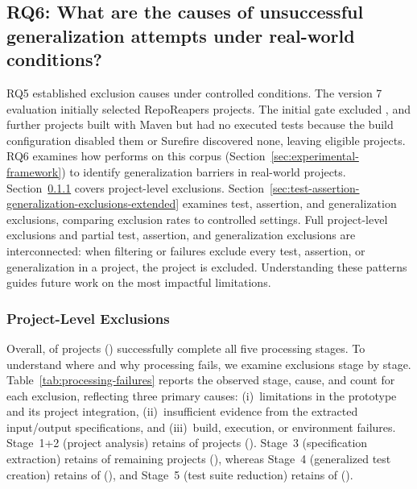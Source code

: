 \subsection{RQ6: What are the causes of unsuccessful generalization attempts under real-world conditions?}
\label{sec:limitations-eval-extended}

RQ5 established exclusion causes under controlled conditions.
The version 7 evaluation initially selected \TzRealworldSelectedProjects{} RepoReapers projects.
The initial gate excluded \TzRealworldInitialGateExcludedProjects{},
and \TzRealworldNoExecutedTestExcludedProjects{} further projects built with Maven
but had no executed tests because the build configuration disabled them or Surefire discovered none,
leaving \TzRealworldEligibleProjects{} eligible projects.
RQ6 examines how \ToolTeralizer{} performs on this corpus
(Section~\ref{sec:experimental-framework})
to identify generalization barriers in real-world projects.
Section~\ref{sec:project-level-exclusions-extended} covers project-level exclusions.
Section~\ref{sec:test-assertion-generalization-exclusions-extended} examines
test, assertion, and generalization exclusions,
comparing exclusion rates to controlled settings.
Full project-level exclusions and
partial test, assertion, and generalization exclusions are interconnected:
when filtering or failures exclude every test, assertion, or generalization in a project,
the project is excluded.
Understanding these patterns guides future work on the most impactful limitations.

\subsubsection{Project-Level Exclusions}%
\label{sec:project-level-exclusions-extended}

Overall, \TzRealworldApplicabilityProjects{} of \TzRealworldEligibleProjects{} projects
(\TzRealworldApplicabilityPct{}) successfully complete all five processing stages.
To understand where and why processing fails,
we examine exclusions stage by stage.
Table~\ref{tab:processing-failures} reports the observed stage, cause, and count for each exclusion,
reflecting three primary causes:
(i)~limitations in the prototype and its project integration,
(ii)~insufficient evidence from the extracted input/output specifications,
and (iii)~build, execution, or environment failures.
Stage~1+2 (project analysis) retains
\TzRealworldStageOneTwoIncluded{} of \TzRealworldStageOneTwoEntering{} projects
(\TzRealworldStageOneTwoIncludedPct{}).
Stage~3 (specification extraction) retains
\TzRealworldStageThreeIncluded{} of \TzRealworldStageThreeEntering{} remaining projects
(\TzRealworldStageThreeIncludedPct{}),
whereas Stage~4 (generalized test creation) retains
\TzRealworldStageFourIncluded{} of \TzRealworldStageFourEntering{}
(\TzRealworldStageFourIncludedPct{}), and
Stage~5 (test suite reduction) retains
\TzRealworldStageFiveIncluded{} of \TzRealworldStageFiveEntering{}
(\TzRealworldStageFiveIncludedPct{}).

